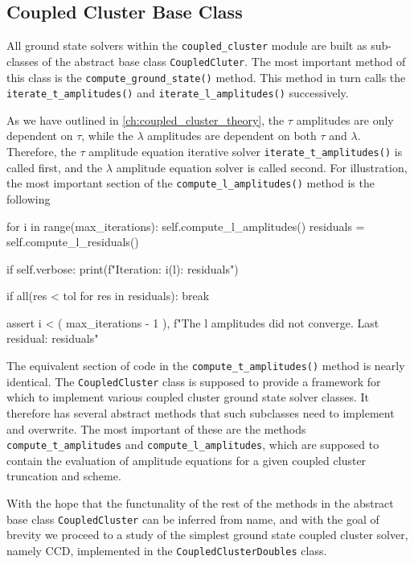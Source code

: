     \subsection{Coupled Cluster Base Class}

    All ground state solvers within the \lstinline{coupled_cluster} module are built 
    as sub-classes of the abstract base class \lstinline{CoupledCluter}. The most
    important method of this class is the \lstinline{compute_ground_state()} method.
    This method in turn calls the \lstinline{iterate_t_amplitudes()} and 
    \lstinline{iterate_l_amplitudes()} successively. 

    

    As we have outlined in 
    \autoref{ch:coupled_cluster_theory}, the $\tau$ amplitudes are only dependent on 
    $\tau$, while the $\lambda$ amplitudes are dependent on both $\tau$ and $\lambda$.
    Therefore, the $\tau$ amplitude equation iterative solver
    \lstinline{iterate_t_amplitudes()} is called first, and the $\lambda$ amplitude
    equation solver is called second.
    For illustration, the most important section of the \lstinline{compute_l_amplitudes()} method 
    is the following
    \begin{python}
    for i in range(max_iterations):
    self.compute_l_amplitudes()
    residuals = self.compute_l_residuals()

    if self.verbose:
        print(f"Iteration: {i}\tResiduals (l): {residuals}")

    if all(res < tol for res in residuals):
        break

    assert i < (
        max_iterations - 1
    ), f"The l amplitudes did not converge. Last residual: {residuals}" 
    \end{python}
    The equivalent section of code in the \lstinline{compute_t_amplitudes()} method is 
    nearly identical.
    The \lstinline{CoupledCluster} class is supposed to provide a framework for which 
    to implement various coupled cluster ground state solver classes. It therefore
    has several abstract methods that such subclasses need to implement and overwrite.
    The most important of these are the methods \lstinline{compute_t_amplitudes} 
    and \lstinline{compute_l_amplitudes}, which are supposed to contain the evaluation 
    of amplitude equations for a given coupled cluster truncation and scheme. 

    With the hope that the functunality of the rest of the methods 
    in the abstract base class \lstinline{CoupledCluster} can be inferred from 
    name, and with the goal of brevity we proceed to a study of the simplest 
    ground state coupled cluster solver, namely CCD, implemented in the 
    \lstinline{CoupledClusterDoubles} class. 

